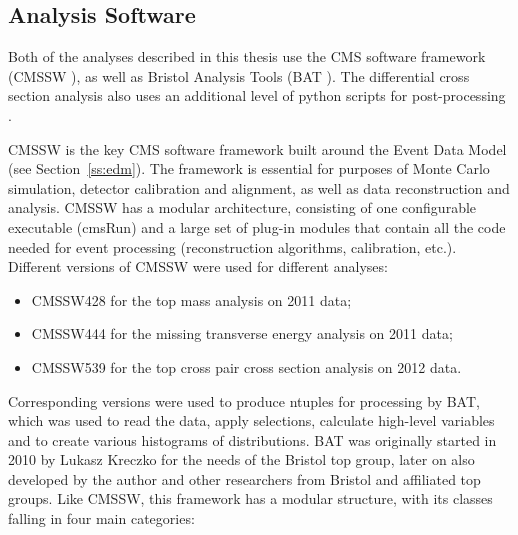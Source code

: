 \subsection{Analysis Software}
\label{ss:analysis_software}
Both of the analyses described in this thesis use the CMS software framework (CMSSW \autocite{CMSSW}), as well as
Bristol Analysis Tools (BAT \autocite{BAT}). The differential cross section analysis also uses an additional level of
python scripts for post-processing \autocite{DailyPythonScripts}.

CMSSW is the key CMS software framework built around the Event Data Model (see Section~\ref{ss:edm}). The framework is
essential for purposes of Monte Carlo simulation, detector calibration and alignment, as well as data reconstruction
and analysis. CMSSW has a modular architecture, consisting of one configurable executable (cmsRun) and a large set of
plug-in modules that contain all the code needed for event processing (reconstruction algorithms, calibration, etc.).
Different versions of CMSSW were used for different analyses: 

\begin{itemize}
  \item CMSSW\underline{\hspace{1ex}}4\underline{\hspace{1ex}}2\underline{\hspace{1ex}}8 for the top mass analysis on 2011 data;
  \item CMSSW\underline{\hspace{1ex}}4\underline{\hspace{1ex}}4\underline{\hspace{1ex}}4 for the missing transverse energy analysis on 2011 data;
  \item CMSSW\underline{\hspace{1ex}}5\underline{\hspace{1ex}}3\underline{\hspace{1ex}}9 for the top cross pair cross section analysis on 2012 data.
\end{itemize}

Corresponding versions were used to produce ntuples for processing by BAT, which was used to read the data, apply
selections, calculate high-level variables and to create various histograms of distributions. BAT was originally started
in 2010 by Lukasz Kreczko for the needs of the Bristol top group, later on also developed by the author and other
researchers from Bristol and affiliated top groups. Like CMSSW, this framework has a modular structure, with its classes
falling in four main categories:

